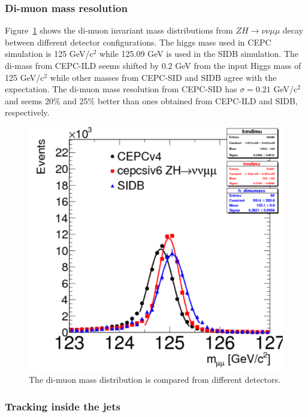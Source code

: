 \subsubsection{Di-muon mass resolution} 

Figure~\ref{fig:dimuons} shows the di-muon invariant mass distributions from $ZH\rightarrow \nu\nu \mu\mu$ decay between
different detector configurations. The higgs mass used in CEPC simulation is 125 GeV/c$^2$ while 125.09 GeV is used in the SIDB simulation. 
The di-mass from CEPC-ILD seems shifted by 0.2 GeV from the input Higgs mass of 125 GeV/c$^2$ while other masses from CEPC-SID and SIDB
agree with the expectation. The di-muon mass resolution from CEPC-SID has $\sigma=0.21$ GeV/c$^2$ and seems 20\% and 25\% better 
than ones obtained from CEPC-ILD and SIDB, respectively. 

\begin{figure}[hbtp]
\begin{center}
\includegraphics[width=0.45\textheight,keepaspectratio]{Figures/TrackingSystem/FullSilicon/Plot_zhnnmumu_DimuonMass.pdf}
\caption{The di-muon mass distribution is compared from different detectors.\label{fig:dimuons}}
\end{center}
\end{figure}

\subsubsection{Tracking inside the jets} 

